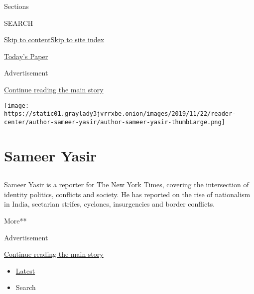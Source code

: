 Sections

SEARCH

\protect\hyperlink{site-content}{Skip to
content}\protect\hyperlink{site-index}{Skip to site index}

\href{https://myaccount.nytimes3xbfgragh.onion/auth/login?response_type=cookie\&client_id=vi}{}

\href{https://www.nytimes3xbfgragh.onion/section/todayspaper}{Today's
Paper}

Advertisement

\protect\hyperlink{after-top}{Continue reading the main story}

\texttt{[image: https://static01.graylady3jvrrxbe.onion/images/2019/11/22/reader-center/author-sameer-yasir/author-sameer-yasir-thumbLarge.png]}

\hypertarget{sameer-yasir}{%
\section{Sameer Yasir}\label{sameer-yasir}}

\subsection{}

Sameer Yasir is a reporter for The New York Times, covering the
intersection of identity politics, conflicts and society. He has
reported on the rise of nationalism in India, sectarian strifes,
cyclones, insurgencies and border conflicts.

More**

Advertisement

\protect\hyperlink{after-mid1}{Continue reading the main story}

\begin{itemize}
\tightlist
\item
  \protect\hyperlink{stream-panel}{Latest}
\item
  Search
\end{itemize}

